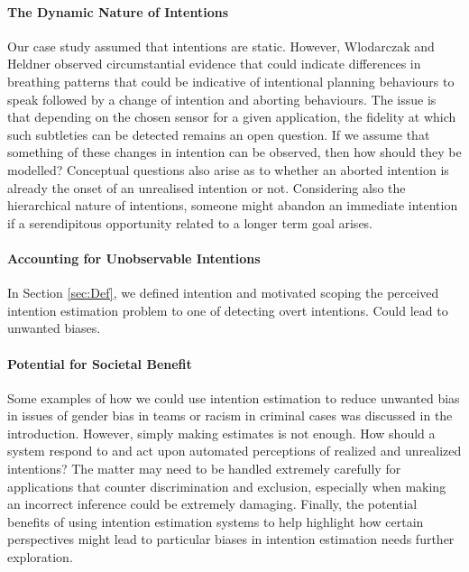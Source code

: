 \documentclass[sigconf]{acmart}
\begin{document}

\paragraph{The Dynamic Nature of Intentions}
Our case study assumed that intentions are static. However, Wlodarczak and Heldner \cite{Wlodarczak2020} observed circumstantial evidence that could indicate differences in breathing patterns that could be indicative of intentional planning behaviours to speak followed by a change of intention and aborting behaviours. The issue is that depending on the chosen sensor for a given application, the fidelity at which such subtleties can be detected remains an open question. If we assume that something of these changes in intention can be observed, then how should they be modelled? Conceptual questions also arise as to whether an aborted intention is already the onset of an unrealised intention or not. Considering also the hierarchical nature of intentions, someone might abandon an immediate intention if a serendipitous opportunity related to a longer term goal arises.

\paragraph{Accounting for Unobservable Intentions}
In Section \ref{sec:Def}, we defined intention and motivated scoping the perceived intention estimation problem to one of detecting overt intentions. Could lead to unwanted biases.

\paragraph {Potential for Societal Benefit} 
Some examples of how we could use intention estimation to reduce unwanted bias in issues of gender bias in teams or racism in criminal cases was discussed in the introduction. However, simply making estimates is not enough. How should a system respond to and act upon automated perceptions of realized and unrealized intentions? The matter may need to be handled extremely carefully for applications that counter discrimination and exclusion, especially when making an incorrect inference could be extremely damaging. Finally, the potential benefits of using intention estimation systems to help highlight how certain perspectives might lead to particular biases in intention estimation needs further exploration.
\balance
\end{document}
